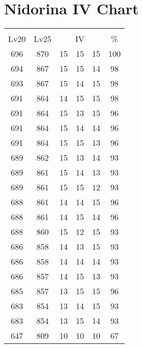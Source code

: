 \documentclass{article}%
\begin{document}
%
\normalsize%
\section{Nidorina IV Chart}%
\label{sec:Nidorina IV Chart}%
\renewcommand{\arraystretch}{1.5}%
\begin{tabular}{|c|c|c|c|c|c|}%
\hline%
\multicolumn{6}{|c|}{\textcolor{white}{ 
\linebreak{Nidorina}
}%
\cellcolor{black}}\\%
\multicolumn{1}{|c}{Lv20}&\multicolumn{1}{c|}{Lv25}&\multicolumn{3}{c|}{IV}&\multicolumn{1}{|c|}{\%}\\%
\hline%
\rowcolor{color100}%
696&870&15&15&15&100\\%
\hline%
\rowcolor{color98}%
694&867&15&15&14&98\\%
\hline%
\rowcolor{color98}%
693&867&15&14&15&98\\%
\hline%
\rowcolor{color98}%
691&864&14&15&15&98\\%
\hline%
\rowcolor{color96}%
691&864&15&13&15&96\\%
\hline%
\rowcolor{color96}%
691&864&15&14&14&96\\%
\hline%
\rowcolor{color96}%
691&864&15&15&13&96\\%
\hline%
\rowcolor{color93}%
689&862&15&13&14&93\\%
\hline%
\rowcolor{color93}%
689&861&15&14&13&93\\%
\hline%
\rowcolor{color93}%
689&861&15&15&12&93\\%
\hline%
\rowcolor{color96}%
688&861&14&14&15&96\\%
\hline%
\rowcolor{color96}%
688&861&14&15&14&96\\%
\hline%
\rowcolor{color93}%
688&860&15&12&15&93\\%
\hline%
\rowcolor{color93}%
686&858&14&13&15&93\\%
\hline%
\rowcolor{color93}%
686&858&14&14&14&93\\%
\hline%
\rowcolor{color93}%
686&857&14&15&13&93\\%
\hline%
\rowcolor{color96}%
685&857&13&15&15&96\\%
\hline%
\rowcolor{color93}%
683&854&13&14&15&93\\%
\hline%
\rowcolor{color93}%
683&854&13&15&14&93\\%
\hline%
\rowcolor{color91}%
647&809&10&10&10&67\\%
\end{tabular}

%
\end{document}
